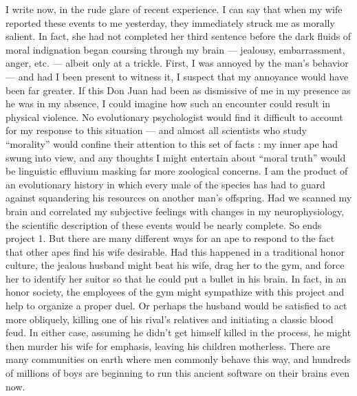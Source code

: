 \documentclass[a4paper,14pt]{extbook}
\begin{document}
I write now, in the rude glare of recent experience.
I can say that when my wife reported these events to me yesterday, they immediately struck me as morally salient.
In fact, she had not completed her third sentence before the dark fluids of moral indignation began coursing through my brain --- jealousy, embarrassment, anger, etc. --- albeit only at a trickle.
First, I was annoyed by the man's behavior --- and had I been present to witness it, I suspect that my annoyance would have been far greater.
If this Don Juan had been as dismissive of me in my presence as he was in my absence, I could imagine how such an encounter could result in physical violence.
No evolutionary psychologist would find it difficult to account for my response to this situation --- and almost all scientists who study ``morality'' would confine their attention to this set of facts :
my inner ape had swung into view, and any thoughts I might entertain about ``moral truth'' would be linguistic effluvium masking far more zoological concerns.
I am the product of an evolutionary history in which every male of the species has had to guard against squandering his resources on another man's offspring.
Had we scanned my brain and correlated my subjective feelings with changes in my neurophysiology, the scientific description of these events would be nearly complete.
So ends project 1.
But there are many different ways for an ape to respond to the fact that other apes find his wife desirable.
Had this happened in a traditional honor culture, the jealous husband might beat his wife, drag her to the gym, and force her to identify her suitor so that he could put a bullet in his brain.
In fact, in an honor society, the employees of the gym might sympathize with this project and help to organize a proper duel.
Or perhaps the husband would be satisfied to act more obliquely, killing one of his rival's relatives and initiating a classic blood feud.
In either case, assuming he didn't get himself killed in the process, he might then murder his wife for emphasis, leaving his children motherless.
There are many communities on earth where men commonly behave this way, and hundreds of millions of boys are beginning to run this ancient software on their brains even now.
\end{document}
